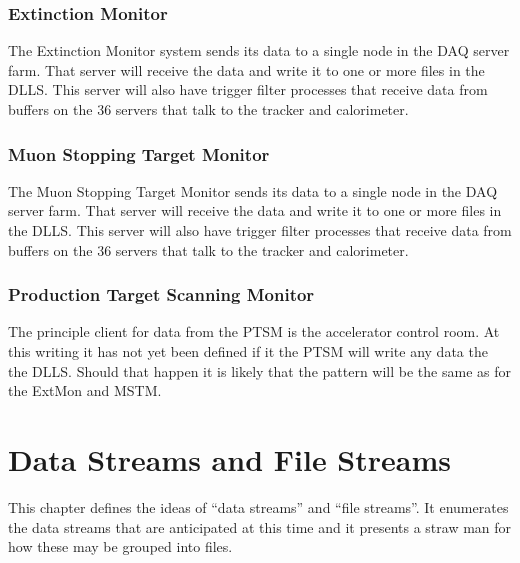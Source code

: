
\subsection{Extinction Monitor}
\label{ssec:ExtMon}

The Extinction Monitor system sends its data to a single node in the DAQ server farm.
That server will receive the data and write it to one or more files in
the DLLS.  This server will also have trigger filter processes that receive
data from buffers on the 36 servers that talk to the tracker and calorimeter.


\subsection{Muon Stopping Target Monitor}
\label{ssec:ExtMon}

The Muon Stopping Target Monitor sends its data to a single node in the DAQ server farm.
That server will receive the data and write it to one or more files in
the DLLS.  This server will also have trigger filter processes that receive
data from buffers on the 36 servers that talk to the tracker and calorimeter.

\subsection{Production Target Scanning Monitor}

The principle client for data from the PTSM is the accelerator control room.
At this writing it has not yet been defined if it the PTSM will write any data the the DLLS.
Should that happen it is likely that the pattern will be the same as for the ExtMon
and MSTM.


\chapter{Data Streams and File Streams}
\label{ch:DataStreamsAndFileStreams}

This chapter defines the ideas of ``data streams'' and ``file streams''.
It enumerates the data streams that are anticipated at this time
and it presents a straw man for how these may be grouped into files.

